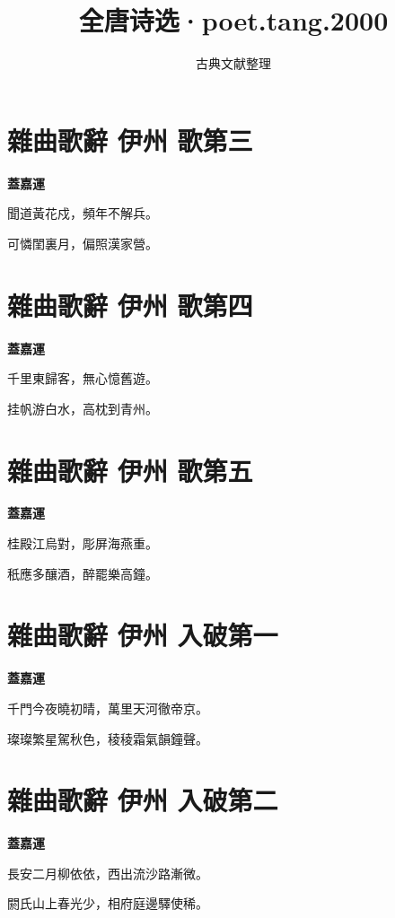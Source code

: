 \documentclass[12pt,a4paper]{ctexbook}
\title{全唐诗选·poet.tang.2000}
\author{古典文献整理}
\date{}
\begin{document}
\maketitle
\tableofcontents
\newpage
\section{雜曲歌辭 伊州 歌第三}
\textbf{蓋嘉運}\par\vspace{0.5em}
聞道黃花戍，頻年不解兵。\par
可憐閨裏月，偏照漢家營。\par

\section{雜曲歌辭 伊州 歌第四}
\textbf{蓋嘉運}\par\vspace{0.5em}
千里東歸客，無心憶舊遊。\par
挂帆游白水，高枕到青州。\par

\section{雜曲歌辭 伊州 歌第五}
\textbf{蓋嘉運}\par\vspace{0.5em}
桂殿江烏對，彫屏海燕重。\par
秖應多釀酒，醉罷樂高鐘。\par

\section{雜曲歌辭 伊州 入破第一}
\textbf{蓋嘉運}\par\vspace{0.5em}
千門今夜曉初晴，萬里天河徹帝京。\par
璨璨繁星駕秋色，稜稜霜氣韻鐘聲。\par

\section{雜曲歌辭 伊州 入破第二}
\textbf{蓋嘉運}\par\vspace{0.5em}
長安二月柳依依，西出流沙路漸微。\par
閼氏山上春光少，相府庭邊驛使稀。\par
\end{document}
